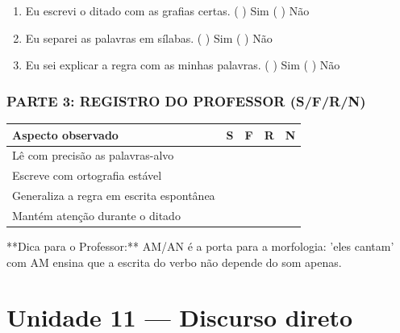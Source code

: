 \begin{exercicio}
\begin{enumerate}[label=\alph*)]
  \item Eu escrevi o ditado com as grafias certas.  \quad ( ) Sim   ( ) Não

  \item Eu separei as palavras em sílabas.  \quad ( ) Sim   ( ) Não

  \item Eu sei explicar a regra com as minhas palavras.  \quad ( ) Sim   ( ) Não

\end{enumerate}

\subsection*{PARTE 3: REGISTRO DO PROFESSOR (S/F/R/N)}

\begin{center}
\renewcommand{\arraystretch}{1.4}
\begin{tabular}{@{}p{9cm}cccc@{}}
\toprule
Aspecto observado & S & F & R & N \\
\midrule
Lê com precisão as palavras-alvo & & & & \\
Escreve com ortografia estável & & & & \\
Generaliza a regra em escrita espontânea & & & & \\
Mantém atenção durante o ditado & & & & \\
\bottomrule\end{tabular}\end{center}

\end{exercicio}

\begin{dica}
**Dica para o Professor:** AM/AN é a porta para a morfologia: 'eles cantam' com AM ensina que a escrita do verbo não depende do som apenas.
\end{dica}


\chapter{Unidade 11 --- Discurso direto}


